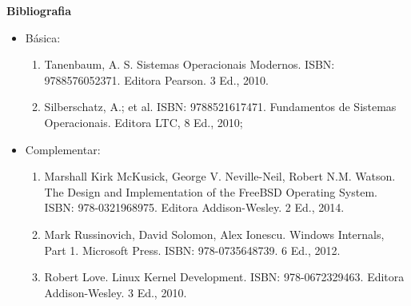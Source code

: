 




%
%
%


\begin{snugshade}\begin{center}\textbf{
    Bibliografia
}\end{center}\end{snugshade}

\begin{itemize} 
  \item Básica:
	\begin{enumerate}
		\item Tanenbaum, A. S. Sistemas Operacionais Modernos. ISBN: 9788576052371. Editora Pearson. 3 Ed., 2010. 
		\item Silberschatz, A.; et al. ISBN: 9788521617471. Fundamentos de Sistemas Operacionais. Editora LTC, 8 Ed., 2010; 
	\end{enumerate}
  \item Complementar:
	\begin{enumerate} 
		\item Marshall Kirk McKusick, George V. Neville-Neil, Robert N.M. Watson. The Design and Implementation of the FreeBSD Operating System. ISBN: 978-0321968975. Editora Addison-Wesley. 2 Ed., 2014.
		\item Mark Russinovich, David Solomon, Alex Ionescu. Windows Internals, Part 1. Microsoft Press. ISBN: 978-0735648739. 6 Ed., 2012.
		\item Robert Love. Linux Kernel Development. ISBN: 978-0672329463. Editora Addison-Wesley. 3 Ed., 2010.
	\end{enumerate}
\end{itemize}
